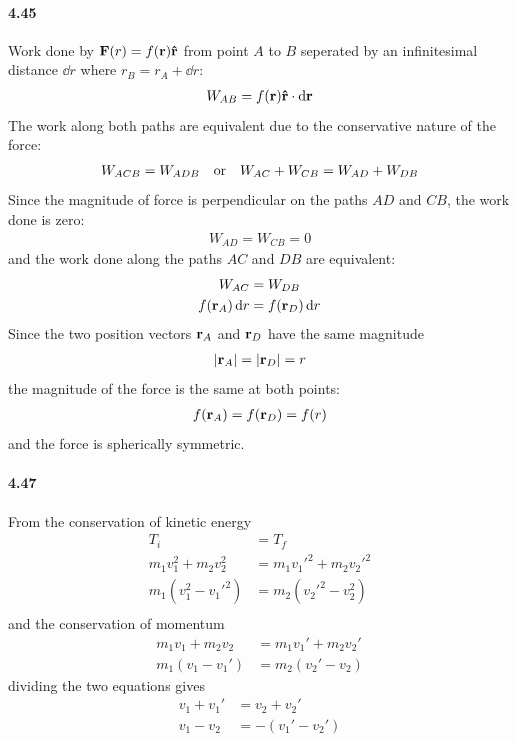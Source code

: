 \documentclass[../problems.tex]{subfiles}
\begin{document}
\paragraph{4.45}
Work done by $\vb{F}(r) = f(\vb{r}) \vu{r}$ from point $A$ to $B$ seperated by an infinitesimal
distance $\dd{r}$ where $r_B = r_A + \dd{r}$: 
\begin{align*}
    W_{AB} = f(\vb{r}) \vu{r} \cdot \dd{\vb{r}}
\end{align*}
The work along both paths are equivalent due to the conservative nature of the force:
\begin{align*}
    W_{ACB} = W_{ADB} \qor W_{AC} + W_{CB} = W_{AD} + W_{DB}
\end{align*}
Since the magnitude of force is perpendicular on the paths $AD$ and $CB$, the work done is zero:
\begin{align*}
    W_{AD} = W_{CB} = 0
\end{align*}
and the work done along the paths $AC$ and $DB$ are equivalent:
\begin{align*}
    W_{AC} &= W_{DB} \\
    f(\vb{r}_A) \dd{r} &= f(\vb{r}_D) \dd{r}
\end{align*}
Since the two position vectors $\vb{r}_A$ and $\vb{r}_D$ have the same magnitude
\begin{align*}
    \abs{\vb{r}_A} = \abs{\vb{r}_D} = r
\end{align*}
the magnitude of the force is the same at both points:
\begin{align*}
    f(\vb{r}_A) = f(\vb{r}_D) = f(r)
\end{align*}
and the force is spherically symmetric.

\paragraph{4.47}
From the conservation of kinetic energy
\begin{align*}
    T_i &= T_f \\
    m_1 v_1^2 + m_2 v_2^2 &= m_1 v_1'^2 + m_2 v_2'^2 \\
    m_1(v_1^2 - v_1'^2) &= m_2(v_2'^2 - v_2^2) \\
\end{align*}
and the conservation of momentum
\begin{align*}
    m_1 v_1 + m_2 v_2 &= m_1 v_1' + m_2 v_2' \\
    m_1(v_1 - v_1') &= m_2(v_2' - v_2)
\end{align*}
dividing the two equations gives
\begin{align*}
    v_1 + v_1' &= v_2 + v_2' \\
    v_1 - v_2 &= -(v_1' - v_2')
\end{align*}
\end{document}

